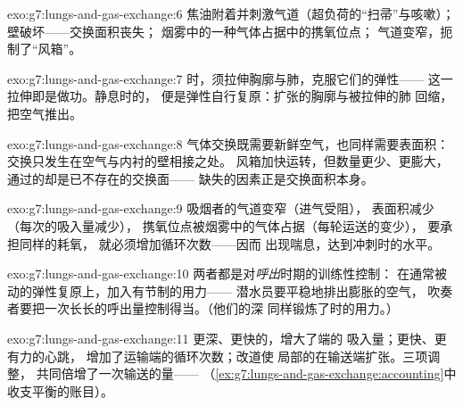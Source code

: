 \begin{solution}{exo:g7:lungs-and-gas-exchange:6}
焦油附着并刺激气道（超负荷的“扫帚”与咳嗽）；
壁破坏——交换面积丧失；
烟雾中的一种气体占据中的携氧位点；
气道变窄，扼制了“风箱”。
\end{solution}

\begin{solution}{exo:g7:lungs-and-gas-exchange:7}
时，须拉伸胸廓与肺，克服它们的弹性——
这一拉伸即是做功。静息时的，
便是弹性自行复原：扩张的胸廓与被拉伸的肺
回缩，把空气推出。
\end{solution}

\begin{solution}{exo:g7:lungs-and-gas-exchange:8}
气体交换既需要新鲜空气，也同样需要表面积：
交换只发生在空气与内衬的壁相接之处。
风箱加快运转，但数量更少、更膨大，
通过的却是已不存在的交换面——
缺失的因素正是交换面积本身。
\end{solution}

\begin{solution}{exo:g7:lungs-and-gas-exchange:9}
吸烟者的气道变窄（进气受阻），
表面积减少（每次的吸入量减少），
携氧位点被烟雾中的气体占据（每轮运送的变少），
要承担同样的耗氧，
就必须增加循环次数——因而
出现喘息，达到冲刺时的水平。
\end{solution}

\begin{solution}{exo:g7:lungs-and-gas-exchange:10}
两者都是对\emph{呼出}时期的训练性控制：
在通常被动的弹性复原上，加入有节制的用力——
潜水员要平稳地排出膨胀的空气，
吹奏者要把一次长长的呼出量控制得当。（他们的深
同样锻炼了时的用力。）
\end{solution}

\begin{solution}{exo:g7:lungs-and-gas-exchange:11}
更深、更快的，增大了端的
吸入量；更快、更有力的心跳，
增加了运输端的循环次数；改道使
局部的在输送端扩张。三项调整，
共同倍增了一次输送的量——
（\cref{ex:g7:lungs-and-gas-exchange:accounting}中
收支平衡的账目）。
\end{solution}

